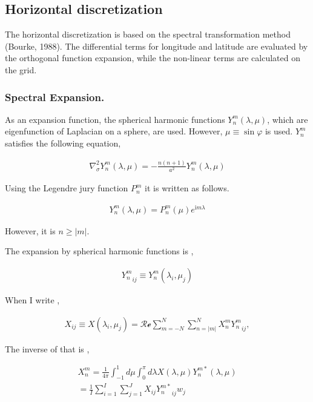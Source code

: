 \hypertarget{horizontal-discretization}{%
\subsection{Horizontal discretization}\label{horizontal-discretization}}

The horizontal discretization is based on the spectral transformation
method (Bourke, 1988). The differential terms for longitude and latitude
are evaluated by the orthogonal function expansion, while the non-linear
terms are calculated on the grid.

\hypertarget{spectral-expansion.}{%
\subsubsection{Spectral Expansion.}\label{spectral-expansion.}}

As an expansion function, the spherical harmonic functions
\(Y_n^m(\lambda,\mu)\), which are eigenfunction of Laplacian on a
sphere, are used. However, \(\mu \equiv \sin\varphi\) is used. \(Y_n^m\)
satisfies the following equation,

\begin{eqnarray}
\nabla^{2}_{\sigma} Y_n^m(\lambda,\mu)
= - \frac{n(n+1)}{a^{2}} Y_n^m(\lambda,\mu)
\end{eqnarray}

Using the Legendre jury function \(P_n^m\) it is written as follows.

\begin{eqnarray}
Y_n^m(\lambda,\mu) = P_n^m (\mu) e^{\mathrm{i}m \lambda}
\end{eqnarray}

However, it is \(n \geq | m |\).

The expansion by spherical harmonic functions is ,

\begin{eqnarray}
   {Y_n^m}_{ij} \equiv Y_n^m ( \lambda_i, \mu_j )
\end{eqnarray}

When I write ,

\begin{eqnarray}
  X_{ij} \equiv X ( \lambda_i, \mu_j )
   =  \mathcal{Re} \sum_{m=-N}^{N} \sum_{n=|m|}^{N}
        X_n^m {Y_n^m}_{ij} ,
\end{eqnarray}

The inverse of that is ,

\begin{eqnarray}
  X_n^m
         =  \frac{1}{4 \pi}
             \int_{-1}^{1} d \mu \int_{0}^{\pi} d \lambda
               X( \lambda, \mu ) Y_n^{m *} ( \lambda, \mu ) \\
         =  \frac{1}{I} \sum_{i=1}^{I} \sum_{j=1}^{J}  
               X_{ij} {Y_n^{m*}}_{ij} w_j
\end{eqnarray}

